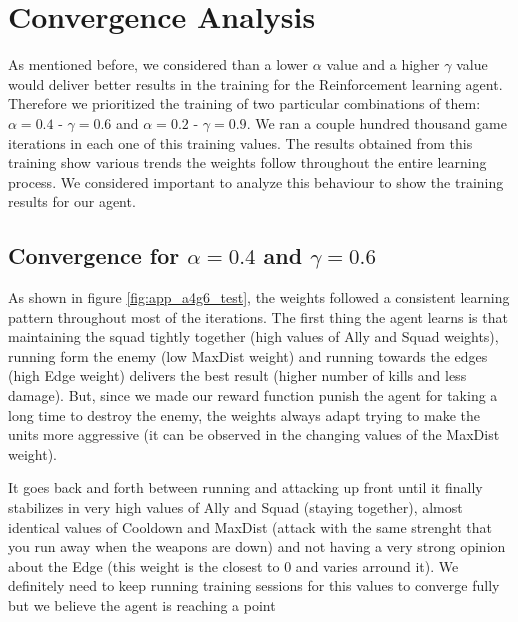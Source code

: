 
\section{Convergence Analysis}

As mentioned before, we considered than a lower $\alpha$ value and a higher $\gamma$ value would deliver better results in the training for the Reinforcement learning agent. Therefore we prioritized the training of two particular combinations of them: $\alpha= 0.4$ - $\gamma = 0.6$ and $\alpha= 0.2$ - $\gamma = 0.9$. We ran a couple hundred thousand game iterations in each one of this training values. The results obtained from this training show various trends the weights follow throughout the entire learning process. We considered important to analyze this behaviour to show the training results for our agent. \\

\subsection*{Convergence for $\alpha= 0.4$ and $\gamma = 0.6$}

As shown in figure \ref{fig:app_a4g6_test}, the weights followed a consistent learning pattern throughout most of the iterations. The first thing the agent learns is that maintaining the squad tightly together (high values of Ally and Squad weights), running form the enemy (low MaxDist weight) and running towards the edges (high Edge weight) delivers the best result (higher number of kills and less damage). But, since we made our reward function punish the agent for taking a long time to destroy the enemy, the weights always adapt trying to make the units more aggressive (it can be observed in the changing values of the MaxDist weight). 

It goes back and forth between running and attacking up front until it finally stabilizes in very high values of Ally and Squad (staying together), almost identical values of Cooldown and MaxDist (attack with the same strenght that you run away when the weapons are down) and not having a very strong opinion about the Edge (this weight is the closest to 0 and varies arround it). We definitely need to keep running training sessions for this values to converge fully but we believe the agent is reaching a point 